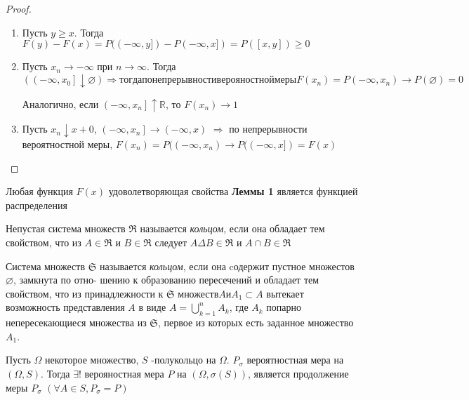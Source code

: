 \begin{proof}
	\begin{enumerate}
		\item Пусть $ y \geq x $. Тогда $F(y)-F(x) = P((-\infty, y])-P(-\infty, x]) =  P(\left[x,y\right]) \geq 0$
		
		\item 
		Пусть $x_{n} \rightarrow-\infty$ при $n \rightarrow \infty$. Тогда $\left(\left(-\infty, x_{0}\right] \downarrow \varnothing\right)  \Rightarrow тогда по непрерывности верояностной меры F(x_n) = P\left(-\infty,x_n\right) \rightarrow P(\varnothing)=0 $
		
		
		Аналогично, если $\left(-\infty, x_{n}\right] \uparrow \mathbb{R}$, то $F\left(x_{n}\right) \rightarrow 1$
		
		\item 
		Пусть $x_{n}\downarrow x+0$, $\left(-\infty, x_{n}\right] \rightarrow(-\infty, x)$ $\Rightarrow$ по непрерывности вероятностной меры,
		$F\left(x_{n}\right)=P((-\infty, x_n ) \rightarrow P((-\infty, x])=F(x)$
		
	\end{enumerate}	
\end{proof}	

\begin{definition}
	Любая функция $ F(x) $ удоволетворяющая свойства \textbf{Леммы 1} является функцией распределения
\end{definition}

\begin{definition}
	Непустая система множеств $\mathfrak{R}$ называется \textit{кольцом}, если она обладает тем свойством, что из $ A \in \mathfrak{R} $ и $ B \in  \mathfrak{R}$ следует $A \Delta B \in \mathfrak{R}$ и $A \cap B \in \mathfrak{R}$
\end{definition}
\begin{definition}
	Система множеств $\mathfrak{S}$ называется \textit{кольцом}, если она cодержит пустное множестов $ \varnothing $, замкнута по отно- 
	шению к образованию пересечений и обладает тем свойством, что 
	из принадлежности к $\mathfrak{S}$ множеств$A \textbf{и} A_{1} \subset A$ вытекает возможность представления $A$ в виде $A=\bigcup_{k=1}^{n} A_{k}$, где $A_{k}$ попарно непересекающиеся множества из $\mathfrak{S}$, первое из которых есть заданное 
	множество $A_{1}$.
\end{definition}		
 
\begin{theorem}
	Пусть $ \Omega $ некоторое множество, $ S $ -полукольцо на $ \Omega $. $ P_{\sigma} $ вероятностная мера на $ \left(\Omega, S\right) $. Тогда $ \exists ! $ верояностная мера $ P $
	на $ (\Omega ,\sigma(S) )$, является продолжение меры $ P_{\sigma} $  $ \left(\forall A \in S, P_{\sigma} = P \right) $
\end{theorem}


